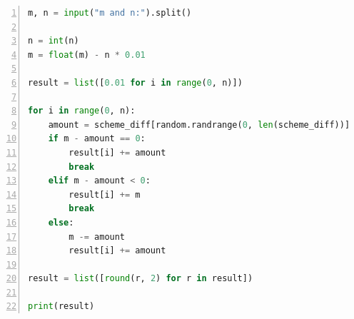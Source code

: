 \documentclass[a4paper,twoside]{article}
\begin{document}
\begin{spacing}{1.2}
\begin{lstlisting}[language=Python,numbers=left,style=PythonStyle,caption=红包发放,label={code:redpacket}]
m, n = input("m and n:").split()

n = int(n)
m = float(m) - n * 0.01

result = list([0.01 for i in range(0, n)])

for i in range(0, n):
	amount = scheme_diff[random.randrange(0, len(scheme_diff))]
	if m - amount == 0:
		result[i] += amount
		break
	elif m - amount < 0:
		result[i] += m
		break
	else:
		m -= amount
		result[i] += amount

result = list([round(r, 2) for r in result])

print(result)

\end{lstlisting}

\end{spacing}
\end{document}
